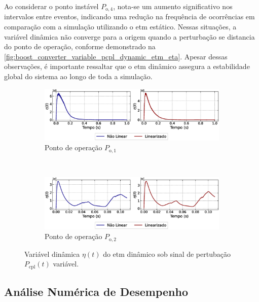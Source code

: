 Ao considerar o ponto instável $P_{\mathrm{o}, 4}$, nota-se um aumento significativo nos intervalos entre eventos, indicando uma redução na frequência de ocorrências em comparação com a simulação utilizando o \acrshort{etm} estático. Nessas situações, a variável dinâmica não converge para a origem quando a perturbação se distancia do ponto de operação, conforme demonstrado na \autoref{fig:boost_converter_variable_pcpl_dynamic_etm_eta}. Apesar dessas observações, é importante ressaltar que o \acrshort{etm} dinâmico assegura a estabilidade global do sistema ao longo de toda a simulação.

\begin{figure}[H]
  \centering
  \captionsetup{justification=centering}
  \begin{subfigure}{1.\textwidth}
    \centering
    \includegraphics[width=1.\textwidth]{figuras/dynamic-etm/boost/sim2/op1/eta.eps}
    \caption{Ponto de operação $P_{\mathrm{o}, 1}$}
  \end{subfigure}
  \\[6pt]
  \begin{subfigure}{1.\textwidth}
    \centering
    \includegraphics[width=1.\textwidth]{figuras/dynamic-etm/boost/sim2/op2/eta.eps}
    \caption{Ponto de operação $P_{\mathrm{o}, 2}$}
  \end{subfigure}
  \caption{Variável dinâmica $\eta(t)$ do \acrshort{etm} dinâmico sob sinal de pertubação $P_{\mathrm{cpl}}(t)$ variável.}
  \label{fig:boost_converter_variable_pcpl_dynamic_etm_eta}
\end{figure}

\subsection{Análise Numérica de Desempenho}


